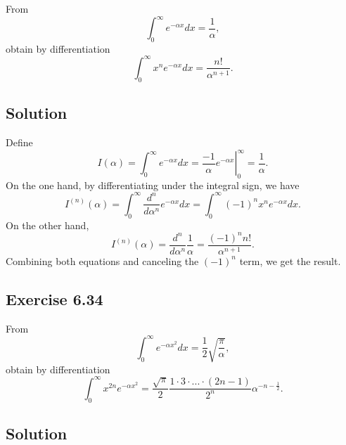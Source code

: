 From
\begin{equation*}
    \int_0^{\infty} e^{-\alpha x} dx = \frac{1}{\alpha},
\end{equation*}
obtain by differentiation
\begin{equation*}
    \int_0^{\infty} x^n e^{-\alpha x} dx = \frac{n!}{\alpha^{n+1}}.
\end{equation*}

\subsection*{Solution}

Define
\begin{equation*}
    I(\alpha) = \int_0^{\infty} e^{-\alpha x} dx
        = \left. \frac{-1}{\alpha} e^{-\alpha x} \right|_0^{\infty}
        = \frac{1}{\alpha}.
\end{equation*}
On the one hand, by differentiating under the integral sign, we have
\begin{equation*}
    I^{(n)}(\alpha)
        = \int_0^{\infty} \frac{d^n}{d\alpha^n} e^{-\alpha x} dx
        = \int_0^{\infty} (-1)^n x^n e^{-\alpha x} dx.
\end{equation*}
On the other hand,
\begin{equation*}
    I^{(n)}(\alpha)
        = \frac{d^n}{d\alpha^n} \frac{1}{\alpha}
        = \frac{(-1)^n n!}{\alpha^{n+1}}.
\end{equation*}
Combining both equations and canceling the $(-1)^n$ term, we get the result.


\subsection*{Exercise 6.34}

From
\begin{equation*}
    \int_0^{\infty} e^{-\alpha x^2} dx = \frac{1}{2} \sqrt{\frac{\pi}{\alpha}},
\end{equation*}
obtain by differentiation
\begin{equation*}
    \int_0^{\infty} x^{2n} e^{-\alpha x^2} = \frac{\sqrt{\pi}}{2} \frac{1 \cdot 3 \cdot ... \cdot (2n - 1)}{2^n} \alpha^{-n - \frac{1}{2}}.
\end{equation*}

\subsection*{Solution}

